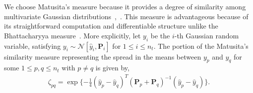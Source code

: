 We choose Matusita's measure because it provides a degree of similarity among multivariate Gaussian distributions~\cite{Mat55},~\cite{Coal_k}. 
This measure is advantageous because of its straightforward computation and differentiable structure unlike the Bhattacharyya measure~\cite{Bhatt97}.
More explicitly, let $y_i$ be the $i$-th Gaussian random variable, satisfying $y_i \sim \mathcal{N}[\hat y_i,{\mathbf P}_i]$ for $1\leq i \leq n_t$. The portion of the Matusita's similarity measure representing the spread in the means between $y_p$ and $y_q$ for some $1\leq p,q\leq n_t$ with $p\neq q$ is given by,
\begin{align}
\zeta_{pq}=\exp \{-\frac14(\hat y_{p}- \hat y_{q})^T({\mathbf P}_{p}
+{\mathbf P}_{q})^{-1}(\hat y_{p}-\hat y_{q})\}.\label{eqn:Mat2Est}
\end{align}



